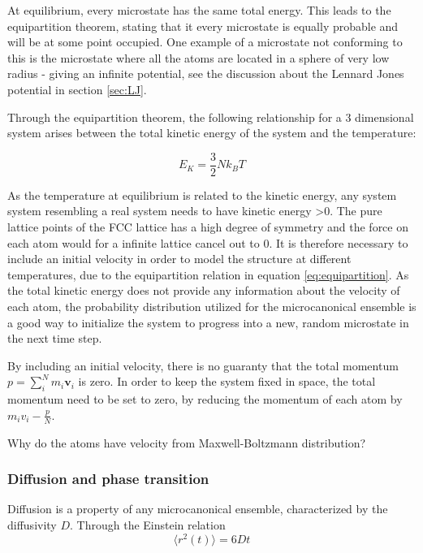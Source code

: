 At equilibrium, every microstate has the same total energy. This leads to  the equipartition theorem, stating that it every microstate is equally probable and will be at some point occupied. One example of a microstate not conforming to this is the microstate where all the atoms are located in a sphere of very low radius - giving an infinite potential, see the discussion about the Lennard Jones potential in section \ref{sec:LJ}. 

Through the equipartition theorem, the following relationship for a 3 dimensional system arises between the total kinetic energy of the system and the temperature:

\begin{equation}\label{eq:equipartition}
E_K = \frac{3	}{2}Nk_BT
\end{equation}

As the temperature at equilibrium is related to the kinetic energy, any system system resembling a real system needs to have kinetic energy >0. The pure lattice points of the FCC lattice has a high degree of symmetry and the force on each atom would for a infinite lattice cancel out to 0. It is therefore necessary to include an initial velocity in order to model the structure at different temperatures, due to the equipartition relation in equation \ref{eq:equipartition}. As the total kinetic energy does not provide any information about the velocity of each atom, the probability distribution utilized for the microcanonical ensemble is a good way to initialize the system to progress into a new, random microstate in the next time step. 

By including an initial velocity, there is no guaranty that the total momentum $ p = \sum\limits_{i}^{N} m_i\textbf{v}_i $ is zero. In order to keep the system fixed in space, the total momentum need to be set to zero, by reducing the momentum of each atom by $ m_iv_i - \frac{p}{N}$. 

Why do the atoms have velocity from Maxwell-Boltzmann distribution?

\subsubsection{Diffusion and phase transition}
Diffusion is a property of any microcanonical ensemble, characterized by the diffusivity $ D $. Through the Einstein relation
\begin{equation}\label{eq:Einstein}
\langle r^2(t) \rangle = 6Dt
\end{equation}

